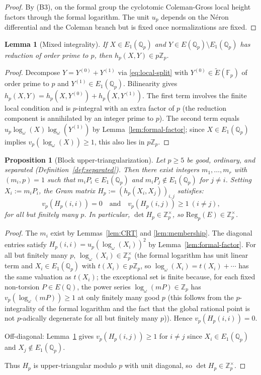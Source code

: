 \documentclass[12pt,reqno]{amsart}
\newtheorem{lemma}[theorem]{Lemma}
\newtheorem{proposition}[theorem]{Proposition}
\theoremstyle{definition}
\theoremstyle{remark}
\newcommand{\Q}{\mathbb{Q}}
\newcommand{\Fp}{\mathbb{F}_p}
\newcommand{\Qp}{\mathbb{Q}_p}
\newcommand{\Zp}{\mathbb{Z}_p}
\newcommand{\Reg}{\mathrm{Reg}}
\begin{document}
\begin{proof}
By (B3), on the formal group the cyclotomic Coleman-Gross local height factors through the formal logarithm.  The unit $u_p$ depends on the N\'eron differential and the Coleman branch but is fixed once normalizations are fixed.
\end{proof}

\begin{lemma}[Mixed integrality]\label{lem:mixed}
If $X\in E_1(\Qp)$ and $Y\in E(\Qp)\setminus E_1(\Qp)$ has reduction of order prime to $p$, then $h_p(X,Y)\in p\Zp$.
\end{lemma}

\begin{proof}
Decompose $Y=Y^{(0)}+Y^{(1)}$ via \eqref{eq:local-split} with $Y^{(0)}\in\widetilde E(\Fp)$ of order prime to $p$ and $Y^{(1)}\in E_1(\Qp)$.  Bilinearity gives $h_p(X,Y)=h_p(X,Y^{(0)})+h_p(X,Y^{(1)})$.  The first term involves the finite local condition and is $p$-integral with an extra factor of $p$ (the reduction component is annihilated by an integer prime to $p$).  The second term equals $u_p\log_\omega(X)\log_\omega(Y^{(1)})$ by Lemma~\ref{lem:formal-factor}; since $X\in E_1(\Qp)$ implies $v_p(\log_\omega(X))\ge 1$, this also lies in $p\Zp$.
\end{proof}

\begin{proposition}[Block upper-triangularization]\label{prop:triangular}
Let $p\ge 5$ be good, ordinary, and separated (Definition~\ref{def:separated}).  Then there exist integers $m_1,\dots,m_r$ with $(m_i,p)=1$ such that $m_iP_i\in E_1(\Qp)$ and $m_iP_j\notin E_1(\Qp)$ for $j\ne i$.  Setting $X_i:=m_iP_i$, the Gram matrix $H_p:=(h_p(X_i,X_j))_{i,j}$ satisfies:
\[
v_p(H_p(i,i))=0\quad\text{and}\quad v_p(H_p(i,j))\ge 1\ (i\ne j),
\]
for all but finitely many $p$.  In particular, $\det H_p\in\Zp^\times$, so $\Reg_p(E)\in\Zp^\times$.
\end{proposition}

\begin{proof}
The $m_i$ exist by Lemmas~\ref{lem:CRT} and \ref{lem:membership}.  The diagonal entries satisfy $H_p(i,i)=u_p(\log_\omega(X_i))^2$ by Lemma~\ref{lem:formal-factor}.  For all but finitely many $p$, $\log_\omega(X_i)\in\Zp^\times$ (the formal logarithm has unit linear term and $X_i\in E_1(\Qp)$ with $t(X_i)\in p\Zp$, so $\log_\omega(X_i)=t(X_i)+\cdots$ has the same valuation as $t(X_i)$; the exceptional set is finite because, for each fixed non-torsion $P\in E(\Q)$, the power series $\log_\omega(mP)\in\Zp$ has $v_p(\log_\omega(mP))\ge 1$ at only finitely many good $p$ (this follows from the $p$-integrality of the formal logarithm and the fact that the global rational point is not $p$-adically degenerate for all but finitely many $p$)).  Hence $v_p(H_p(i,i))=0$.

Off-diagonal: Lemma~\ref{lem:mixed} gives $v_p(H_p(i,j))\ge 1$ for $i\ne j$ since $X_i\in E_1(\Qp)$ and $X_j\notin E_1(\Qp)$.

Thus $H_p$ is upper-triangular modulo $p$ with unit diagonal, so $\det H_p\in\Zp^\times$.
\end{proof}
\end{document}
